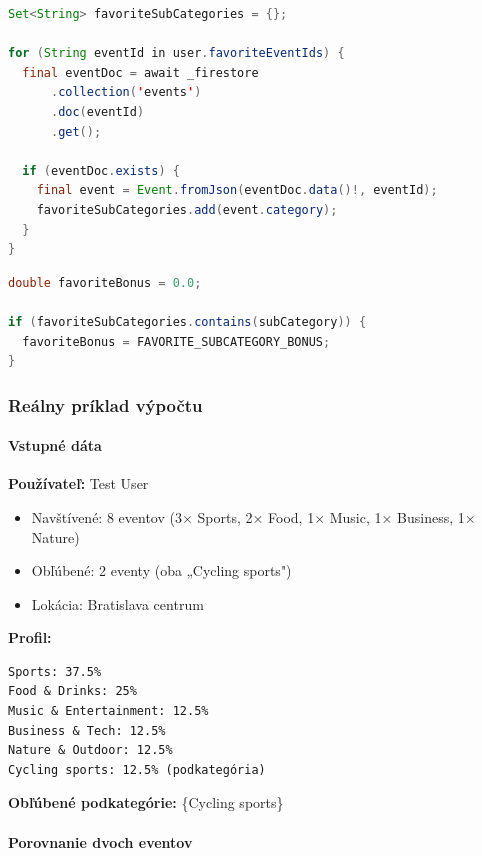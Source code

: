 \begin{lstlisting}[language=Java, caption=Načítanie obľúbených podkategórií]
Set<String> favoriteSubCategories = {};

for (String eventId in user.favoriteEventIds) {
  final eventDoc = await _firestore
      .collection('events')
      .doc(eventId)
      .get();

  if (eventDoc.exists) {
    final event = Event.fromJson(eventDoc.data()!, eventId);
    favoriteSubCategories.add(event.category);
  }
}
\end{lstlisting}

\begin{lstlisting}[language=Java, caption=Výpočet bonusu za obľúbenú kategóriu]
double favoriteBonus = 0.0;

if (favoriteSubCategories.contains(subCategory)) {
  favoriteBonus = FAVORITE_SUBCATEGORY_BONUS;
}
\end{lstlisting}

\subsubsection{Reálny príklad výpočtu}

\paragraph{Vstupné dáta}

\textbf{Používateľ:} Test User
\begin{itemize}
    \item Navštívené: 8 eventov (3× Sports, 2× Food, 1× Music, 1× Business, 1× Nature)
    \item Obľúbené: 2 eventy (oba „Cycling sports")
    \item Lokácia: Bratislava centrum
\end{itemize}

\textbf{Profil:}
\begin{verbatim}
Sports: 37.5%
Food & Drinks: 25%
Music & Entertainment: 12.5%
Business & Tech: 12.5%
Nature & Outdoor: 12.5%
Cycling sports: 12.5% (podkategória)
\end{verbatim}

\textbf{Obľúbené podkategórie:} \{Cycling sports\}

\paragraph{Porovnanie dvoch eventov}

